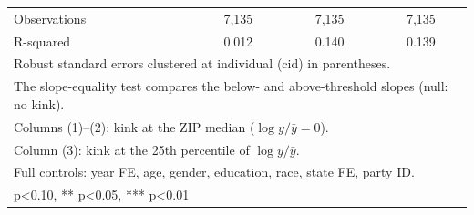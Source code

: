 \begin{table}[htbp]
\begin{tabular}{l*{3}{c}}
Observations&       7,135         &       7,135         &       7,135         \\
R-squared   &       0.012         &       0.140         &       0.139         \\
\bottomrule
\multicolumn{4}{l}{\footnotesize Robust standard errors clustered at individual (cid) in parentheses.}\\
\multicolumn{4}{l}{\footnotesize The slope-equality test compares the below- and above-threshold slopes (null: no kink).}\\
\multicolumn{4}{l}{\footnotesize Columns (1)--(2): kink at the ZIP median ($\log y/\bar{y} = 0$).}\\
\multicolumn{4}{l}{\footnotesize Column (3): kink at the 25th percentile of $\log y/\bar{y}$.}\\
\multicolumn{4}{l}{\footnotesize Full controls: year FE, age, gender, education, race, state FE, party ID.}\\
\multicolumn{4}{l}{\footnotesize * p<0.10, ** p<0.05, *** p<0.01}\\
\end{tabular}
\end{table}
